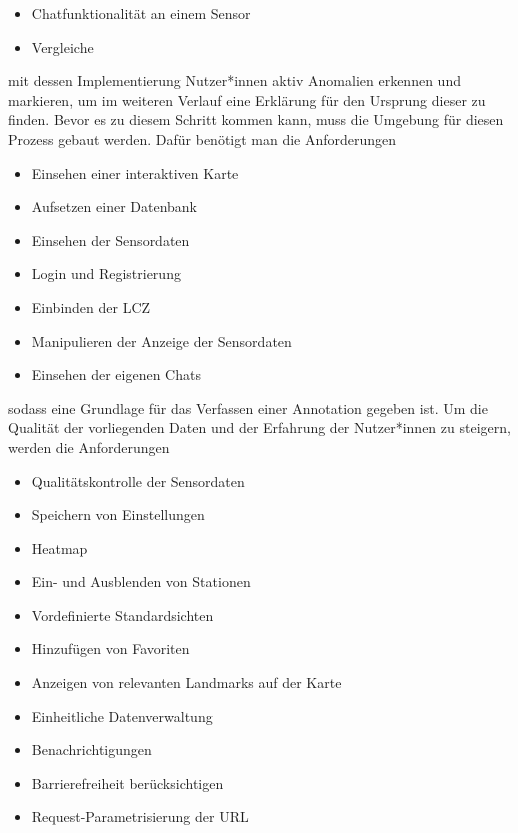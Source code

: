 \begin{itemize}
    \item Chatfunktionalität an einem Sensor
    \item Vergleiche
\end{itemize}

mit dessen Implementierung Nutzer*innen aktiv Anomalien erkennen und markieren, um im weiteren Verlauf eine Erklärung für den Ursprung dieser zu finden. Bevor es zu diesem Schritt kommen kann, muss die Umgebung für diesen Prozess gebaut werden. Dafür benötigt man die Anforderungen 

\begin{itemize}
    \item Einsehen einer interaktiven Karte
    \item Aufsetzen einer Datenbank
    \item Einsehen der Sensordaten
    \item Login und Registrierung
    \item Einbinden der \ac{LCZ}
    \item Manipulieren der Anzeige der Sensordaten
    \item Einsehen der eigenen Chats
\end{itemize}

sodass eine Grundlage für das Verfassen einer Annotation gegeben ist. Um die Qualität der vorliegenden Daten und der Erfahrung der Nutzer*innen zu steigern, werden die Anforderungen 

\begin{itemize}
    \item Qualitätskontrolle der Sensordaten
    \item Speichern von Einstellungen
    \item Heatmap
    \item Ein- und Ausblenden von Stationen
    \item Vordefinierte Standardsichten
    \item Hinzufügen von Favoriten
    \item Anzeigen von relevanten Landmarks auf der Karte
    \item Einheitliche Datenverwaltung
    \item Benachrichtigungen
    \item Barrierefreiheit berücksichtigen
    \item Request-Parametrisierung der URL
\end{itemize}

